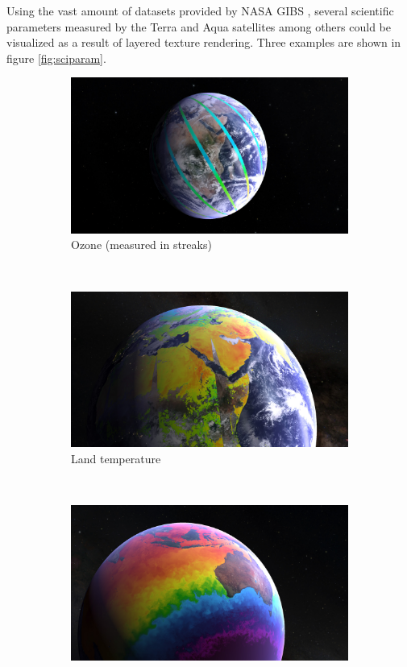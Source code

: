 Using the vast amount of datasets provided by NASA GIBS \cite{gibs}, several scientific parameters measured by the Terra and Aqua satellites among others could be visualized as a result of layered texture rendering. Three examples are shown in figure \ref{fig:sciparam}.

\begin{figure}[h]
    \centering
    \begin{subfigure}[t]{0.45\textwidth}
        \includegraphics[width=\textwidth]{figures/results/screenshots_science_params/ozone.jpg}
        \caption{Ozone (measured in streaks)}
    \end{subfigure}
    ~
    \begin{subfigure}[t]{0.45\textwidth}
        \includegraphics[width=\textwidth]{figures/results/screenshots_science_params/land_temp.jpg}
        \caption{Land temperature}
    \end{subfigure}
    ~
    \begin{subfigure}[t]{0.90\textwidth}
        \includegraphics[width=\textwidth]{figures/results/screenshots_science_params/sea_surface.jpg}

\end{subfigure}
\end{figure}
